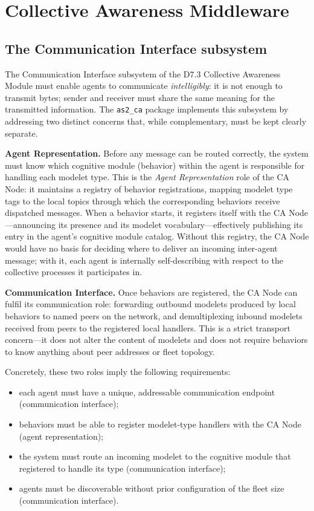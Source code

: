 \documentclass[deliverable]{csreport}
\renewcommand{\code}[1]{\texttt{\textcolor{CSMaroon}{#1}}}%
\begin{document}

\chapter{Collective Awareness Middleware}
\label{ch:ca}

\section{The Communication Interface subsystem}

The Communication Interface subsystem of the D7.3 Collective Awareness Module must enable agents to communicate \emph{intelligibly}: it is not enough to transmit bytes; sender and receiver must share the same meaning for the transmitted information. The \code{as2\_ca} package implements this subsystem by addressing two distinct concerns that, while complementary, must be kept clearly separate.

\textbf{Agent Representation.} Before any message can be routed correctly, the system must know which cognitive module (behavior) within the agent is responsible for handling each modelet type. This is the \emph{Agent Representation} role of the CA Node: it maintains a registry of behavior registrations, mapping modelet type tags to the local topics through which the corresponding behaviors receive dispatched messages. When a behavior starts, it registers itself with the CA Node---announcing its presence and its modelet vocabulary---effectively publishing its entry in the agent's cognitive module catalog. Without this registry, the CA Node would have no basis for deciding where to deliver an incoming inter-agent message; with it, each agent is internally self-describing with respect to the collective processes it participates in.

\textbf{Communication Interface.} Once behaviors are registered, the CA Node can fulfil its communication role: forwarding outbound modelets produced by local behaviors to named peers on the network, and demultiplexing inbound modelets received from peers to the registered local handlers. This is a strict transport concern---it does not alter the content of modelets and does not require behaviors to know anything about peer addresses or fleet topology.

Concretely, these two roles imply the following requirements:
\begin{itemize}
  \item each agent must have a unique, addressable communication endpoint (communication interface);
  \item behaviors must be able to register modelet-type handlers with the CA Node (agent representation);
  \item the system must route an incoming modelet to the cognitive module that registered to handle its type (communication interface);
  \item agents must be discoverable without prior configuration of the fleet size (communication interface).
\end{itemize}
\end{document}
